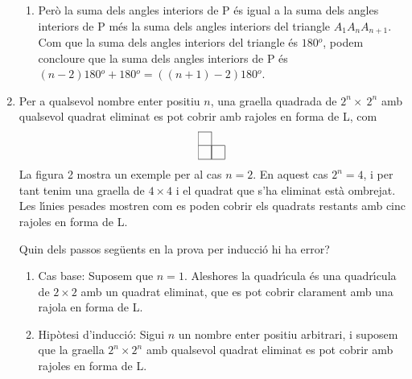 \begin{enumerate}
\begin{enumerate}
\item Per\`{o} la suma dels angles interiors de P \'{e}s igual a la suma dels
angles interiors de P m\'{e}s la suma dels angles interiors del triangle
$A_{1}A_{n}A_{n+1}$. Com que la suma dels angles interiors del triangle \'{e}s
$180%
{{}^o}%
$, podem concloure que la suma dels angles interiors de P \'{e}s $(n-2)180%
{{}^o}%
+180%
{{}^o}%
=((n+1)-2)180%
{{}^o}%
$.
\end{enumerate}

\item Per a qualsevol nombre enter positiu $n$, una graella quadrada de
$2^{n}\times\ 2^{n}$ amb qualsevol quadrat eliminat es pot cobrir amb rajoles
en forma de L, com
\[%
\begin{tabular}
[c]{|l|l}\cline{1-1}
& \\\hline
& \multicolumn{1}{|l|}{}\\\hline
\end{tabular}
\]
La figura 2 mostra un exemple per al cas $n=2$. En aquest cas $2^{n}=4$, i per
tant tenim una graella de $4\times4$ i el quadrat que s'ha eliminat est\`{a}
ombrejat. Les l\'{\i}nies pesades mostren com es poden cobrir els quadrats
restants amb cinc rajoles en forma de L.%

Quin dels passos seg\"{u}ents en la prova per inducci\'{o} hi ha error?

\begin{enumerate}
\item Cas base: Suposem que $n=1$. Aleshores la quadr\'{\i}cula \'{e}s una
quadr\'{\i}cula de $2\times2$ amb un quadrat eliminat, que es pot cobrir
clarament amb una rajola en forma de L.

\item Hip\`{o}tesi d'inducci\'{o}: Sigui $n$ un nombre enter positiu
arbitrari, i suposem que la graella $2^{n}\times2^{n}$ amb qualsevol quadrat
eliminat es pot cobrir amb rajoles en forma de L.


\end{enumerate}
\end{enumerate}
